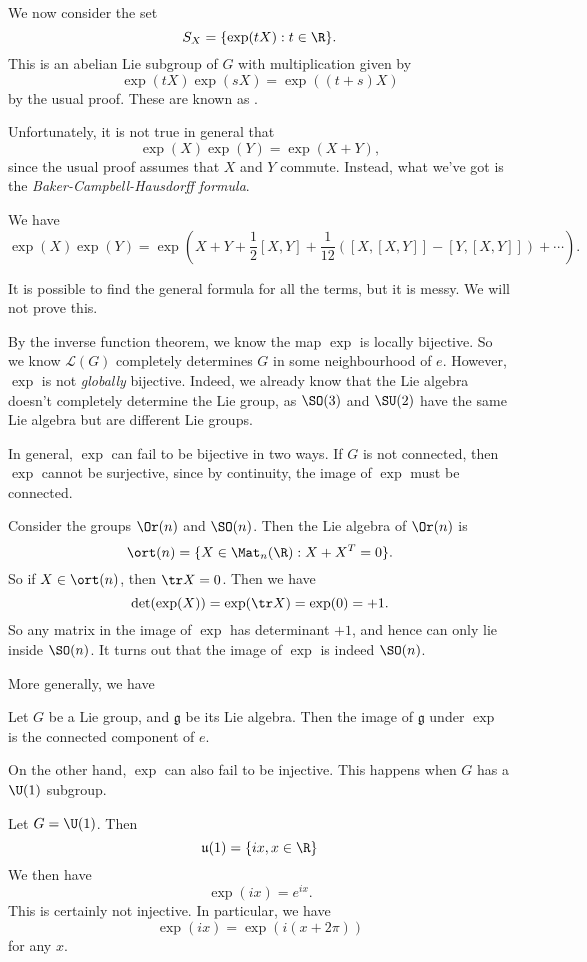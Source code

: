 \documentclass[a4paper]{article}
\begin{document}
We now consider the set
\[
  S_{X} = \{\exp(tX): t \in \R\}.
\]
This is an abelian Lie subgroup of $G$ with multiplication given by
\[
  \exp(tX) \exp(sX) = \exp((t + s)X)
\]
by the usual proof. These are known as .

Unfortunately, it is not true in general that
\[
  \exp(X) \exp(Y) = \exp(X + Y),
\]
since the usual proof assumes that $X$ and $Y$ commute. Instead, what we've got is the \emph{Baker-Campbell-Hausdorff formula}.
\begin{thm}
  We have
  \[
    \exp(X) \exp(Y) = \exp\left(X + Y + \frac{1}{2}[X, Y] + \frac{1}{12}([X, [X, Y]] - [Y, [X, Y]]) + \cdots\right).
  \]
\end{thm}
It is possible to find the general formula for all the terms, but it is messy. We will not prove this.

By the inverse function theorem, we know the map $\exp$ is locally bijective. So we know $\mathcal{L}(G)$ completely determines $G$ in some neighbourhood of $e$. However, $\exp$ is not \emph{globally} bijective. Indeed, we already know that the Lie algebra doesn't completely determine the Lie group, as $\SO(3)$ and $\SU(2)$ have the same Lie algebra but are different Lie groups.

In general, $\exp$ can fail to be bijective in two ways. If $G$ is not connected, then $\exp$ cannot be surjective, since by continuity, the image of $\exp$ must be connected.

\begin{eg}
  Consider the groups $\Or(n)$ and $\SO(n)$. Then the Lie algebra of $\Or(n)$ is
  \[
    \ort(n) = \{X \in \Mat_n(\R): X + X^T = 0\}.
  \]
  So if $X \in \ort(n)$, then $\tr X = 0$. Then we have
  \[
    \det (\exp(X)) = \exp(\tr X) = \exp(0) = +1.
  \]
  So any matrix in the image of $\exp$ has determinant $+1$, and hence can only lie inside $\SO(n)$. It turns out that the image of $\exp$ is indeed $\SO(n)$.
\end{eg}

More generally, we have
\begin{prop}
  Let $G$ be a Lie group, and $\mathfrak{g}$ be its Lie algebra. Then the image of $\mathfrak{g}$ under $\exp$ is the connected component of $e$.
\end{prop}

On the other hand, $\exp$ can also fail to be injective. This happens when $G$ has a $\U(1)$ subgroup.
\begin{eg}
  Let $G = \U(1)$. Then
  \[
    \mathfrak{u}(1) = \{ix, x \in \R\}
  \]
  We then have
  \[
    \exp(ix) = e^{ix}.
  \]
  This is certainly not injective. In particular, we have
  \[
    \exp(ix) = \exp(i(x + 2\pi))
  \]
  for any $x$.
\end{eg}
\end{document}
